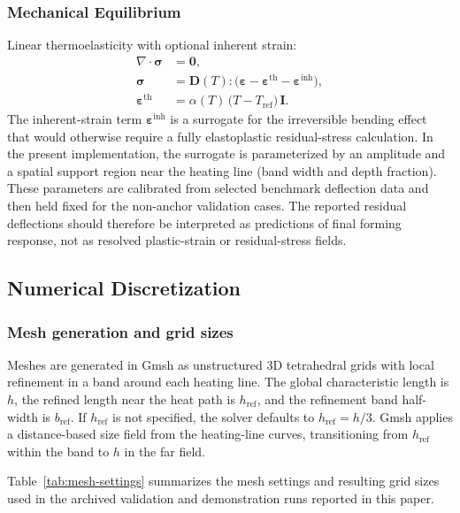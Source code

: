   \subsubsection{Mechanical Equilibrium}
  Linear thermoelasticity with optional inherent strain:
  \begin{align}
  \nabla \cdot \boldsymbol{\sigma} &= \mathbf{0}, \\
  \boldsymbol{\sigma} &= \mathbf{D}(T):\bigl(\boldsymbol{\varepsilon}-\boldsymbol{\varepsilon}^{\mathrm{th}}-\boldsymbol{\varepsilon}^{\mathrm{inh}}\bigr), \\
  \boldsymbol{\varepsilon}^{\mathrm{th}} &= \alpha(T)\,\bigl(T - T_{\mathrm{ref}}\bigr)\,\mathbf{I}.
  \end{align}
  The inherent-strain term $\boldsymbol{\varepsilon}^{\mathrm{inh}}$ is a surrogate for the irreversible bending effect that would otherwise require a fully elastoplastic residual-stress calculation. In the present implementation, the surrogate is parameterized by an amplitude and a spatial support region near the heating line (band width and depth fraction). These parameters are calibrated from selected benchmark deflection data and then held fixed for the non-anchor validation cases. The reported residual deflections should therefore be interpreted as predictions of final forming response, not as resolved plastic-strain or residual-stress fields.

  \subsection{Numerical Discretization}
  \label{sec:numerical-discretization}

  \subsubsection{Mesh generation and grid sizes}
  Meshes are generated in Gmsh as unstructured 3D tetrahedral grids with local refinement in a band around each heating line. The global characteristic length is $h$, the refined length near the heat path is $h_{\mathrm{ref}}$, and the refinement band half-width is $b_{\mathrm{ref}}$. If $h_{\mathrm{ref}}$ is not specified, the solver defaults to $h_{\mathrm{ref}}=h/3$. Gmsh applies a distance-based size field from the heating-line curves, transitioning from $h_{\mathrm{ref}}$ within the band to $h$ in the far field.

  Table~\ref{tab:mesh-settings} summarizes the mesh settings and resulting grid sizes used in the archived validation and demonstration runs reported in this paper.


